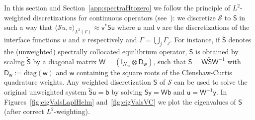 \documentclass[final,onefignum,onetabnum]{siamart250211}
\newcommand{\vct}[1]{\bm{\mathsf{#1}}}
\newcommand{\mtx}[1]{\bm{\mathsf{#1}}}
\theoremstyle{definition}
\begin{document}
In this section and Section~\ref{app:spectraHtozero} we follow the principle of $L^2$-weighted discretizations for continuous operators (see~\cite[\S43]{embree}): we discretize $\mathcal{S}$ to $\mtx{S}$ in such a way that $\langle\mathcal{S}u,v\rangle_{L^2(\Gamma)}\approx \vct{v}^*\mtx{S}\vct{u}$ where $\vct{u}$ and $\vct{v}$ are the discretizations of the interface functions $u$ and $v$ respectively and $\Gamma=\bigcup_j\Gamma_j$. For instance, if $\widetilde{\mtx{S}}$ denotes the (unweighted) spectrally collocated equilibrium operator, $\mtx{S}$ is obtained by scaling $\widetilde{\mtx{S}}$ by a diagonal matrix $\mtx{W} = \left(\mtx{I}_{N_{\text{ds}}}\otimes \mtx{D}_{\vct{w}}\right)$, such that $\mtx{S} = \mtx{W}\widetilde{\mtx{S}}\mtx{W}^{-1}$ with $\mtx{D}_{\vct{w}}:=\text{diag}(\vct{w})$ and $\vct{w}$ containing the square roots of the Clenshaw-Curtis quadrature weights. Any weighted discretization $\mtx{S}$ of $\mathcal{S}$ can be used to solve the original unweighted system $\widetilde{\mtx{S}}\vct{u} = \vct{b}$ by solving $\mtx{S}\vct{y} = \mtx{W}\vct{b}$ and $\vct{u} = \mtx{W}^{-1}\vct{y}$. In Figures~\ref{fig:eigValsLaplHelm} and~\ref{fig:eigValsVC} we plot the eigenvalues of $\mtx{S}$ (after correct $L^2$-weighting).
\end{document}
